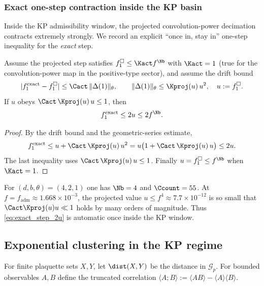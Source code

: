 \subsubsection{Exact one-step contraction inside the KP basin}\label{sec:one_step_contraction}

Inside the KP admissibility window, the projected convolution-power decimation contracts extremely strongly.
We record an explicit ``once in, stay in'' one-step inequality for the \emph{exact} step.

\begin{lemma}\label{lem:exact_step_2u}
Assume the projected step satisfies $f_1^{\square}\le \Kact f^{\Nb}$ with $\Kact=1$ (true for the convolution-power map in the positive-type sector), and assume the drift bound
\[
|f_1^{\mathrm{exact}}-f_1^{\square}|\le \Cact\,\|\Delta(1)\|_{\theta},
\qquad
\|\Delta(1)\|_{\theta}\le \Kproj(u)\,u^2,
\quad u:=f_1^{\square}.
\]
If $u$ obeys $\Cact\,\Kproj(u)\,u\le 1$, then
\begin{equation}\label{eq:exact_step_2u}
 f_1^{\mathrm{exact}}\le 2u\le 2 f^{\Nb}.
\end{equation}
\end{lemma}

\begin{proof}
By the drift bound and the geometric-series estimate,
\[
f_1^{\mathrm{exact}}
\le
u+\Cact\,\Kproj(u)\,u^2
=
u\bigl(1+\Cact\,\Kproj(u)\,u\bigr)
\le 2u.
\]
The last inequality uses $\Cact\,\Kproj(u)\,u\le 1$.
Finally $u=f_1^{\square}\le f^{\Nb}$ when $\Kact=1$.
\end{proof}

\begin{remark}
For $(d,b,\theta)=(4,2,1)$ one has $\Nb=4$ and $\Ccount=55$.
At $f=f_{\mathrm{adm}}\approx 1.668\times 10^{-3}$, the projected value $u\le f^{4}\approx 7.7\times 10^{-12}$ is so small that $\Cact\Kproj(u)u\ll 1$ holds by many orders of magnitude.
Thus \eqref{eq:exact_step_2u} is automatic once inside the KP window.
\end{remark}


\subsection{Exponential clustering in the KP regime}

For finite plaquette sets $X,Y$, let $\dist(X,Y)$ be the distance in $\mathcal G_p$.
For bounded observables $A,B$ define the truncated correlation $\langle A;B\rangle:=\langle AB\rangle-\langle A\rangle\langle B\rangle$.

